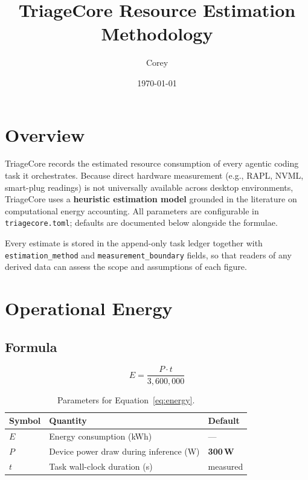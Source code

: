 \documentclass[12pt]{article}
\title{TriageCore Resource Estimation Methodology}
\author{Corey}
\date{\today}
\begin{document}
\maketitle
\tableofcontents
\newpage

\section{Overview}

TriageCore records the estimated resource consumption of every agentic coding
task it orchestrates. Because direct hardware measurement (e.g., RAPL, NVML,
smart-plug readings) is not universally available across desktop environments,
TriageCore uses a \textbf{heuristic estimation model} grounded in the
literature on computational energy accounting. All parameters are configurable
in \texttt{triagecore.toml}; defaults are documented below alongside the
formulae.

Every estimate is stored in the append-only task ledger together with
\texttt{estimation\_method} and \texttt{measurement\_boundary} fields, so that
readers of any derived data can assess the scope and assumptions of each figure.

\section{Operational Energy}

\subsection*{Formula}

\begin{equation}
  E = \frac{P \cdot t}{3{,}600{,}000}
  \label{eq:energy}
\end{equation}

\begin{table}[h!]
\centering
\begin{tabular}{@{}lll@{}}
\toprule
Symbol & Quantity & Default \\
\midrule
$E$   & Energy consumption (kWh)                    & --- \\
$P$   & Device power draw during inference (W)      & \textbf{300\,W} \\
$t$   & Task wall-clock duration (s)                & measured \\
\bottomrule
\end{tabular}
\caption{Parameters for Equation~\ref{eq:energy}.}
\end{table}
\end{document}
